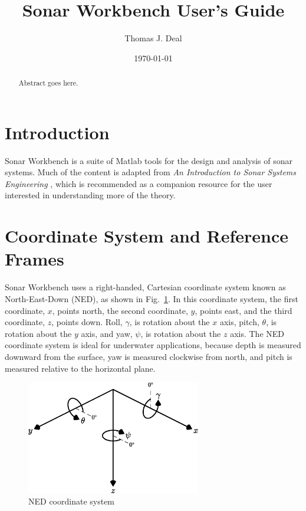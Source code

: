 \documentclass[11pt]{article}
\newcommand{\figname}{Fig.}
\begin{document}
\title{Sonar Workbench User's Guide}
\author{Thomas J. Deal}
\date{\today}
\maketitle

\begin{abstract}
Abstract goes here.
\end{abstract}

\newpage
\tableofcontents

\newpage
\section{Introduction}\label{sec:intro}
Sonar Workbench is a suite of Matlab tools for the design and analysis of sonar systems. Much of the content is adapted from \emph{An Introduction to Sonar Systems Engineering} \cite{Ziomek}, which is recommended as a companion resource for the user interested in understanding more of the theory.

\section{Coordinate System and Reference Frames}\label{sec:coord}
Sonar Workbench uses a right-handed, Cartesian coordinate system known as North-East-Down (NED), as shown in \figname~\ref{fig:NED}. In this coordinate system, the first coordinate, $x$, points north, the second coordinate, $y$, points east, and the third coordinate, $z$, points down. Roll, $\gamma$, is rotation about the $x$ axis, pitch, $\theta$, is rotation about the $y$ axis, and yaw, $\psi$, is rotation about the $z$ axis. The NED coordinate system is ideal for underwater applications, because depth is measured downward from the surface, yaw is measured clockwise from north, and pitch is measured relative to the horizontal plane.

\begin{figure}[!ht]
\begin{center}
\includegraphics[width=3in]{NEDCoordinateSystem}
\caption{\label{fig:NED}NED coordinate system}
\end{center}
\end{figure}
\end{document}
